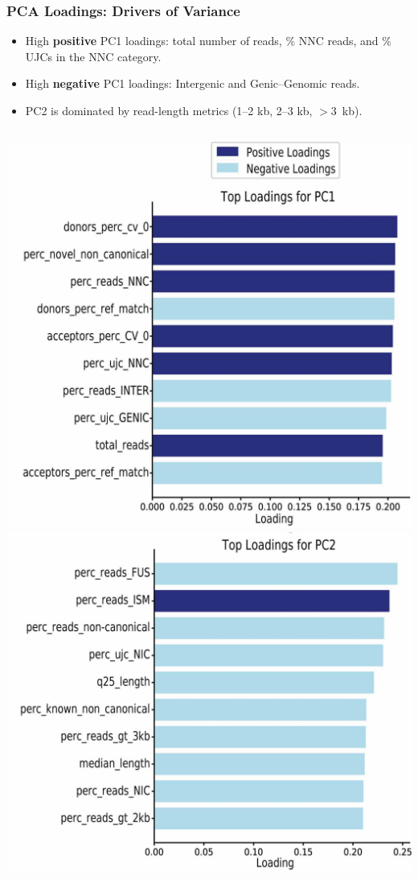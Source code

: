 \documentclass[aspectratio=169]{beamer}
\begin{document}
\begin{frame}
  \frametitle{PCA Loadings: Drivers of Variance}
  \begin{itemize}
    \item High \textbf{positive} PC1 loadings: total number of reads, \% NNC reads, and \% UJCs in the NNC category.
    \item High \textbf{negative} PC1 loadings: Intergenic and Genic–Genomic reads.
    \item PC2 is dominated by read-length metrics (1–2 kb, 2–3 kb, $>3$~kb).
  \end{itemize}
  \vspace{0.3cm}
  \centering
  \begin{columns}[c]
      \includegraphics[width=\linewidth]{Genome Res_figure2_b1.jpg}
      \includegraphics[width=\linewidth]{Genome Res_figure2_b2.jpg}
  \end{columns}
\end{frame}
\end{document}
